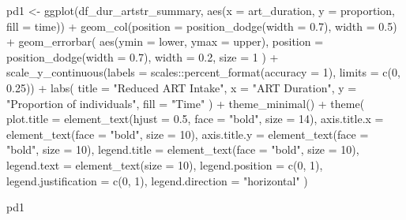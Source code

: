 \documentclass[
  letterpaper,
  DIV=11,
  numbers=noendperiod]{scrartcl}
\newenvironment{Shaded}{\begin{snugshade}}{\end{snugshade}}
\newcommand{\AttributeTok}[1]{\textcolor[rgb]{0.40,0.45,0.13}{#1}}
\newcommand{\DecValTok}[1]{\textcolor[rgb]{0.68,0.00,0.00}{#1}}
\newcommand{\FloatTok}[1]{\textcolor[rgb]{0.68,0.00,0.00}{#1}}
\newcommand{\FunctionTok}[1]{\textcolor[rgb]{0.28,0.35,0.67}{#1}}
\newcommand{\NormalTok}[1]{\textcolor[rgb]{0.00,0.23,0.31}{#1}}
\newcommand{\OtherTok}[1]{\textcolor[rgb]{0.00,0.23,0.31}{#1}}
\newcommand{\SpecialCharTok}[1]{\textcolor[rgb]{0.37,0.37,0.37}{#1}}
\newcommand{\StringTok}[1]{\textcolor[rgb]{0.13,0.47,0.30}{#1}}
\begin{document}
\begin{Shaded}
\begin{Highlighting}[]
\NormalTok{pd1 }\OtherTok{\textless{}{-}} \FunctionTok{ggplot}\NormalTok{(df\_dur\_artstr\_summary, }\FunctionTok{aes}\NormalTok{(}\AttributeTok{x =}\NormalTok{ art\_duration, }\AttributeTok{y =}\NormalTok{ proportion, }\AttributeTok{fill =}\NormalTok{ time)) }\SpecialCharTok{+}
  \FunctionTok{geom\_col}\NormalTok{(}\AttributeTok{position =} \FunctionTok{position\_dodge}\NormalTok{(}\AttributeTok{width =} \FloatTok{0.7}\NormalTok{), }\AttributeTok{width =} \FloatTok{0.5}\NormalTok{) }\SpecialCharTok{+}
  \FunctionTok{geom\_errorbar}\NormalTok{(}
    \FunctionTok{aes}\NormalTok{(}\AttributeTok{ymin =}\NormalTok{ lower, }\AttributeTok{ymax =}\NormalTok{ upper),}
    \AttributeTok{position =} \FunctionTok{position\_dodge}\NormalTok{(}\AttributeTok{width =} \FloatTok{0.7}\NormalTok{),}
    \AttributeTok{width =} \FloatTok{0.2}\NormalTok{,}
    \AttributeTok{size =} \DecValTok{1}
\NormalTok{  ) }\SpecialCharTok{+}
  \FunctionTok{scale\_y\_continuous}\NormalTok{(}\AttributeTok{labels =}\NormalTok{ scales}\SpecialCharTok{::}\FunctionTok{percent\_format}\NormalTok{(}\AttributeTok{accuracy =} \DecValTok{1}\NormalTok{), }\AttributeTok{limits =} \FunctionTok{c}\NormalTok{(}\DecValTok{0}\NormalTok{, }\FloatTok{0.25}\NormalTok{)) }\SpecialCharTok{+}
  \FunctionTok{labs}\NormalTok{(}
    \AttributeTok{title =} \StringTok{"Reduced ART Intake"}\NormalTok{,}
    \AttributeTok{x =} \StringTok{"ART Duration"}\NormalTok{,}
    \AttributeTok{y =} \StringTok{"Proportion of individuals"}\NormalTok{,}
    \AttributeTok{fill =} \StringTok{"Time"}
\NormalTok{  ) }\SpecialCharTok{+}
  \FunctionTok{theme\_minimal}\NormalTok{() }\SpecialCharTok{+}
  \FunctionTok{theme}\NormalTok{(}
    \AttributeTok{plot.title =} \FunctionTok{element\_text}\NormalTok{(}\AttributeTok{hjust =} \FloatTok{0.5}\NormalTok{, }\AttributeTok{face =} \StringTok{"bold"}\NormalTok{, }\AttributeTok{size =} \DecValTok{14}\NormalTok{),}
    \AttributeTok{axis.title.x =} \FunctionTok{element\_text}\NormalTok{(}\AttributeTok{face =} \StringTok{"bold"}\NormalTok{, }\AttributeTok{size =} \DecValTok{10}\NormalTok{),}
    \AttributeTok{axis.title.y =} \FunctionTok{element\_text}\NormalTok{(}\AttributeTok{face =} \StringTok{"bold"}\NormalTok{, }\AttributeTok{size =} \DecValTok{10}\NormalTok{),}
    \AttributeTok{legend.title =} \FunctionTok{element\_text}\NormalTok{(}\AttributeTok{face =} \StringTok{"bold"}\NormalTok{, }\AttributeTok{size =} \DecValTok{10}\NormalTok{),}
    \AttributeTok{legend.text =} \FunctionTok{element\_text}\NormalTok{(}\AttributeTok{size =} \DecValTok{10}\NormalTok{),}
    \AttributeTok{legend.position =} \FunctionTok{c}\NormalTok{(}\DecValTok{0}\NormalTok{, }\DecValTok{1}\NormalTok{), }
    \AttributeTok{legend.justification =} \FunctionTok{c}\NormalTok{(}\DecValTok{0}\NormalTok{, }\DecValTok{1}\NormalTok{),}
    \AttributeTok{legend.direction =} \StringTok{"horizontal"}
\NormalTok{  )}

\NormalTok{pd1}
\end{Highlighting}
\end{Shaded}
\end{document}
